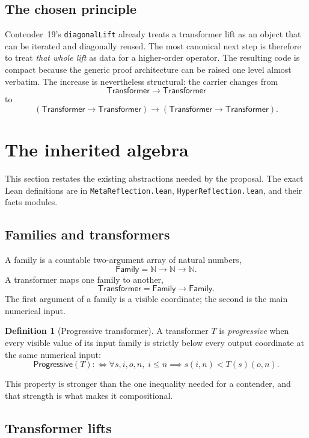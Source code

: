 \documentclass[11pt]{article}
\theoremstyle{definition}
\newtheorem{definition}[theorem]{Definition}
\theoremstyle{remark}
\newcommand{\N}{\mathbb{N}}
\newcommand{\lean}[1]{\nolinkurl{#1}}
\newcommand{\Fam}{\mathsf{Family}}
\newcommand{\Tr}{\mathsf{Transformer}}
\newcommand{\Prog}{\mathsf{Progressive}}
\begin{document}
\subsection{The chosen principle}

Contender~19's \lean{diagonalLift} already treats a transformer lift as an
object that can be iterated and diagonally reused. The most canonical next step
is therefore to treat \emph{that whole lift} as data for a higher-order
operator. The resulting code is compact because the generic proof architecture
can be raised one level almost verbatim. The increase is nevertheless
structural: the carrier changes from
\[
  \Tr\to\Tr
\]
to
\[
  (\Tr\to\Tr)\to(\Tr\to\Tr).
\]

\section{The inherited algebra}

This section restates the existing abstractions needed by the proposal. The
exact Lean definitions are in \lean{MetaReflection.lean},
\lean{HyperReflection.lean}, and their facts modules.

\subsection{Families and transformers}

A family is a countable two-argument array of natural numbers,
\[
  \Fam = \N\to\N\to\N.
\]
A transformer maps one family to another,
\[
  \Tr = \Fam\to\Fam.
\]
The first argument of a family is a visible coordinate; the second is the main
numerical input.

\begin{definition}[Progressive transformer]
A transformer $T$ is \emph{progressive} when every visible value of its input
family is strictly below every output coordinate at the same numerical input:
\[
  \Prog(T) :\Longleftrightarrow
  \forall s,i,o,n,\; i\le n\implies s(i,n)<T(s)(o,n).
\]
\end{definition}

This property is stronger than the one inequality needed for a contender, and
that strength is what makes it compositional.

\subsection{Transformer lifts}
\end{document}
